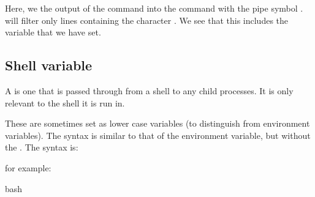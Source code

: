 \documentclass[letterpaper,10pt,english]{sphinxmanual}
\begin{document}
Here, we  the output of the command  into the command  with the pipe symbol \sphinxcode{\sphinxupquote{|}}.  will filter only lines containing the character . We see that this includes the variable  that we have set.

\begin{sphinxVerbatim}[commandchars=\\\{\}]

             
             
\end{sphinxVerbatim}


\subsection{Shell variable}
\label{\detokenize{Appendix1:Shell-variable}}
A  is one that is  passed through from a shell to any child processes. It is only relevant to the shell it is run in.

These are sometimes set as lower case variables (to distinguish from environment variables). The syntax is similar to that of the environment variable, but without the . The syntax is:

\begin{sphinxVerbatim}[commandchars=\\\{\}]
\end{sphinxVerbatim}

for example:

{
\begin{sphinxVerbatim}[commandchars=\\\{\}]
\llap{\color{nbsphinxin}[4]:\,\hspace{\fboxrule}\hspace{\fboxsep}}\PYGZpc{}\PYGZpc{}bash

 
\end{sphinxVerbatim}
}
\end{document}
